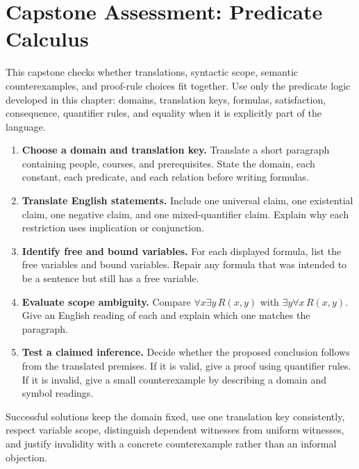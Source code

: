 
\section{Capstone Assessment: Predicate Calculus}

\begin{remark*}
This capstone checks whether translations, syntactic scope, semantic
counterexamples, and proof-rule choices fit together. Use only the predicate
logic developed in this chapter: domains, translation keys, formulas,
satisfaction, consequence, quantifier rules, and equality when it is explicitly
part of the language.
\end{remark*}

\begin{enumerate}
  \item \textbf{Choose a domain and translation key.}
  Translate a short paragraph containing people, courses, and prerequisites.
  State the domain, each constant, each predicate, and each relation before
  writing formulas.

  \item \textbf{Translate English statements.}
  Include one universal claim, one existential claim, one negative claim, and
  one mixed-quantifier claim. Explain why each restriction uses implication or
  conjunction.

  \item \textbf{Identify free and bound variables.}
  For each displayed formula, list the free variables and bound variables.
  Repair any formula that was intended to be a sentence but still has a free
  variable.

  \item \textbf{Evaluate scope ambiguity.}
  Compare \(\forall x\exists y\,R(x,y)\) with
  \(\exists y\forall x\,R(x,y)\). Give an English reading of each and explain
  which one matches the paragraph.

  \item \textbf{Test a claimed inference.}
  Decide whether the proposed conclusion follows from the translated premises.
  If it is valid, give a proof using quantifier rules. If it is invalid, give a
  small counterexample by describing a domain and symbol readings.
\end{enumerate}

\begin{remark*}
Successful solutions keep the domain fixed, use one translation key
consistently, respect variable scope, distinguish dependent witnesses from
uniform witnesses, and justify invalidity with a concrete counterexample rather
than an informal objection.
\end{remark*}
